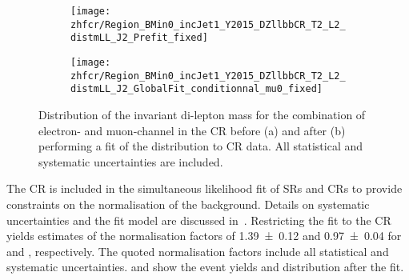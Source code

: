 
\begin{figure}[htbp]
  \centering

  \begin{subfigure}{.485\textwidth}
    \texttt{[image: zhfcr/Region\_BMin0\_incJet1\_Y2015\_DZllbbCR\_T2\_L2\_distmLL\_J2\_Prefit\_fixed]}
    \label{fig:zcr_mll_prefit}
  \end{subfigure}\hfill%
  \begin{subfigure}{.485\textwidth}
    \texttt{[image: zhfcr/Region\_BMin0\_incJet1\_Y2015\_DZllbbCR\_T2\_L2\_distmLL\_J2\_GlobalFit\_conditionnal\_mu0\_fixed]}
    \label{fig:zcr_mll_postfit}
  \end{subfigure}

  \caption[Distribution of the invariant di-lepton mass in the \ZHF~CR.]{
    Distribution of the invariant di-lepton mass for the combination of
    electron- and muon-channel in the \ZHF CR before (a) and after (b)
    performing a fit of the \mll distribution to CR data. All statistical and
    systematic uncertainties are included.}

\end{figure}

The \ZHF CR is included in the simultaneous likelihood fit of SRs and CRs to
provide constraints on the normalisation of the \ZHF background. Details on
systematic uncertainties and the fit model are discussed
in~. Restricting the fit to the
CR yields estimates of the normalisation factors of \num{1.39 \pm 0.12} and
\num{0.97 \pm 0.04} for \ZHF and \ttbar, respectively. The quoted normalisation
factors include all statistical and systematic
uncertainties.  and  show the
event yields and \mll distribution after the fit.

